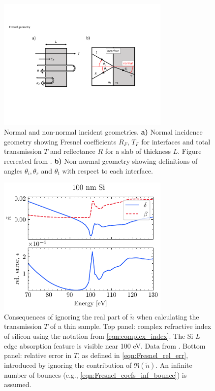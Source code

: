 \begin{figure}
	\centering
	\includegraphics[width=0.75\textwidth]{figures/chap1/Fresnel_Geometry.pdf}
	\caption{Normal and non-normal incident geometries. \textbf{a)} Normal incidence geometry showing Fresnel coefficients $R_F$, $T_F$ for interfaces and total transmission $T$ and reflectance $R$ for a slab of thickness $L$. Figure recreated from \cite{nichelattiComplexRefractiveIndex2002}. \textbf{b)} Non-normal geometry showing definitions of angles $\theta_i, \theta_r$ and $\theta_t$ with respect to each interface.}
	\label{fig:Fresnel_Geometry}
\end{figure}

\begin{figure}
	\centering
	\includegraphics[width=0.75\textwidth]{figures/chap1/Si_transmission_Fresnel.pdf}
	\caption{Consequences of ignoring the real part of $\tilde{n}$ when calculating the transmission $T$ of a thin sample. Top panel: complex refractive index of silicon using the notation from \cref{eqn:complex_index}. The Si $L$-edge absorption feature is visible near 100 eV. Data from \cite{gulliksonCXROXRayInteractions}. Bottom panel: relative error in $T$, as defined in \cref{eqn:Fresnel_rel_err}, introduced by ignoring the contribution of $\Re(\tilde{n})$. An infinite number of bounces (e.g., \cref{eqn:Fresnel_coefs_inf_bounce}) is assumed.}
	\label{fig:Si_transmission_Fresnel}
\end{figure}

